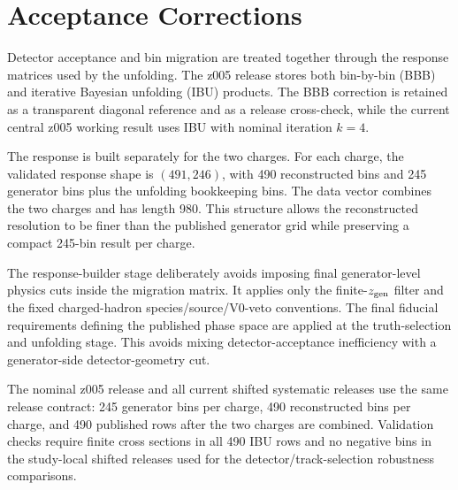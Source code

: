 \section{Acceptance Corrections}
\label{sec:acceptance}

Detector acceptance and bin migration are treated together through the response
matrices used by the unfolding.  The z005 release stores both bin-by-bin (BBB)
and iterative Bayesian unfolding (IBU) products.  The BBB correction is retained
as a transparent diagonal reference and as a release cross-check, while the
current central z005 working result uses IBU with nominal iteration $k=4$.

The response is built separately for the two charges.  For each charge, the
validated response shape is $(491,246)$, with 490 reconstructed bins and 245
generator bins plus the unfolding bookkeeping bins.  The data vector combines
the two charges and has length 980.  This structure allows the reconstructed
resolution to be finer than the published generator grid while preserving a
compact 245-bin result per charge.

The response-builder stage deliberately avoids imposing final generator-level
physics cuts inside the migration matrix.  It applies only the finite-$z_{\rm gen}$
filter and the fixed charged-hadron species/source/V0-veto conventions.  The
final fiducial requirements defining the published phase space are applied at
the truth-selection and unfolding stage.  This avoids mixing detector-acceptance
inefficiency with a generator-side detector-geometry cut.

The nominal z005 release and all current shifted systematic releases use the
same release contract: 245 generator bins per charge, 490 reconstructed bins per
charge, and 490 published rows after the two charges are combined.  Validation
checks require finite cross sections in all 490 IBU rows and no negative bins in
the study-local shifted releases used for the detector/track-selection
robustness comparisons.
